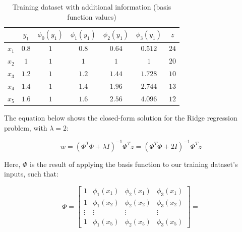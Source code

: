 \documentclass[12pt]{article}
\begin{document}
\begin{enumerate}[leftmargin=\labelsep]
        \begin{table}[h]
          \centering
          \begin{tabular}{c|c|cccc|c}
                  & $y_1$ & $\phi_0(y_1)$ & $\phi_1(y_1)$ & $\phi_2(y_1)$ & $\phi_3(y_1)$ & $z$  \\ \hline
            $x_1$ & $0.8$ & $1$           & $0.8$         & $0.64$        & $0.512$       & $24$ \\
            $x_2$ & $1$   & $1$           & $1$           & $1$           & $1$           & $20$ \\
            $x_3$ & $1.2$ & $1$           & $1.2$         & $1.44$        & $1.728$       & $10$ \\
            $x_4$ & $1.4$ & $1$           & $1.4$         & $1.96$        & $2.744$       & $13$ \\
            $x_5$ & $1.6$ & $1$           & $1.6$         & $2.56$        & $4.096$       & $12$
          \end{tabular}
          \caption{Training dataset with additional information (basis function values)}
          \label{tab:expanded-training-dataset}
        \end{table}

        The equation below shows the closed-form solution for the Ridge regression
        problem, with $\lambda = 2$:

        \begin{equation*}
          w = (\Phi^T \Phi + \lambda I)^{-1} \Phi^T z = (\Phi^T \Phi + 2 I)^{-1} \Phi^T z
        \end{equation*}

        Here, $\Phi$ is the result of applying the basis function to our training
        dataset's inputs, such that:

        \begin{equation*}
          \Phi = \begin{bmatrix}
            1      & \phi_1(x_1) & \phi_2(x_1) & \phi_3(x_1) \\
            1      & \phi_1(x_2) & \phi_2(x_2) & \phi_3(x_2) \\
            \vdots & \vdots      & \vdots      & \vdots      \\
            1      & \phi_1(x_5) & \phi_2(x_5) & \phi_3(x_5)
          \end{bmatrix} = 
        \end{equation*}


\end{enumerate}
\end{document}
